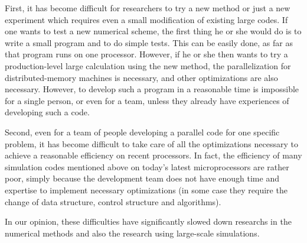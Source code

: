 First, it has become difficult for researchers to try a new method or
just a new experiment which requires even a small modification of
existing large codes. If one wants to test a new numerical scheme, the
first thing he or she would do is to write a small program and to do
simple tests. This can be easily done, as far as that program runs on
one processor. However, if he or she then wants to try a
production-level large calculation using the new method, the
parallelization for distributed-memory machines is necessary, and
other optimizations are also necessary. However, to develop such a
program in a reasonable time is impossible for a single person, or
even for a team, unless they already have experiences of developing
such a code.

Second, even for a team of people developing a parallel code for one
specific problem, it has become difficult to take care of all the
optimizations necessary to achieve a reasonable efficiency on recent
processors. In fact, the efficiency of many simulation codes mentioned
above on today's latest microprocessors are rather poor, simply
because the development team does not have enough time and expertise
to implement necessary optimizations (in some case they require the
change of data structure, control structure and algorithms).

In our opinion, these difficulties have significantly slowed down
researchs in the numerical methods and also the research using
large-scale simulations.



